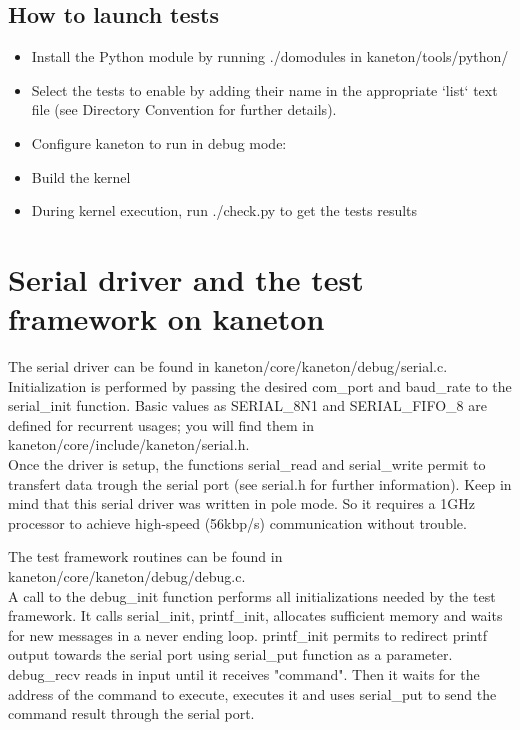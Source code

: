 \subsection{How to launch tests}
\begin{itemize}
\item Install the Python module by running ./domodules in kaneton/tools/python/
\item Select the tests to enable by adding their name in the appropriate `list`
text file (see Directory Convention for further details).
\item Configure kaneton to run in debug mode:
\item Build the kernel
\item During kernel execution, run ./check.py to get the tests results
\end{itemize}


\section{Serial driver and the test framework on kaneton}

The serial driver can be found in kaneton/core/kaneton/debug/serial.c.\\
Initialization is performed by passing the desired com\_port and baud\_rate to
the serial\_init function. Basic values as SERIAL\_8N1 and SERIAL\_FIFO\_8 are
defined for recurrent usages; you will find them in
kaneton/core/include/kaneton/serial.h.\\
Once the driver is setup, the functions serial\_read and serial\_write permit
to transfert data trough the serial port (see serial.h for further
information). Keep in mind that this serial driver was written in pole mode. So
it requires a 1GHz processor to achieve high-speed (56kbp/s) communication
without trouble.

The test framework routines can be found in
kaneton/core/kaneton/debug/debug.c.\\
A call to the debug\_init function performs all initializations needed by the
test framework. It calls serial\_init, printf\_init, allocates sufficient memory
and waits for new messages in a never ending loop. printf\_init permits to
redirect printf output towards the serial port using serial\_put function as a
parameter. debug\_recv reads in input until it receives "command". Then it
waits for the address of the command to execute, executes it and uses
serial\_put to send the command result through the serial port.\\


